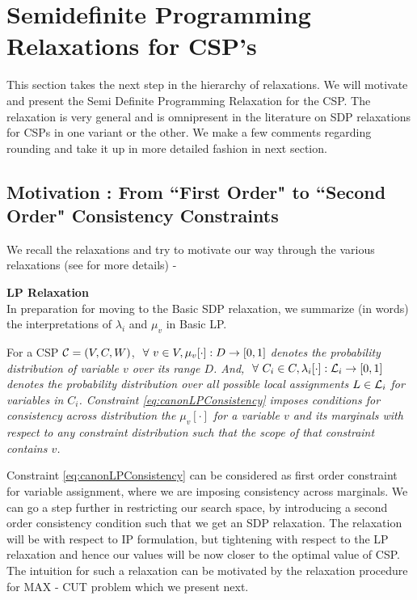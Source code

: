 \section{Semidefinite Programming Relaxations for CSP's}\label{sec:sdpRelax}
This section takes the next step in the hierarchy of relaxations. We will motivate and present the Semi Definite Programming Relaxation for the CSP. The relaxation is very general and is omnipresent in the literature on SDP relaxations for CSPs in one variant or the other. We make a few comments regarding rounding and take it up in more detailed fashion in next section.


\subsection{Motivation : From ``First Order" to ``Second Order" Consistency Constraints}

We recall the relaxations and try to motivate our way through the various relaxations (see \cite{Ryan} for more details) -

\begin{discussion}{\bf LP Relaxation}\\
In preparation for moving to the Basic SDP relaxation, we summarize (in words) the interpretations of $\lambda_i$ and $\mu_v$ in Basic LP.

For a CSP $\mathcal{C} = (V, C, W)$,  \textit{$\ \forall \  v \in V, \mu_v[\cdot] : D \rightarrow [0, 1]$ denotes the \textit{probability distribution of variable $v$ over its range $D$}. And, $\ \forall \  C_i \in C, \lambda_{i}[\cdot] : \mathcal{L}_{i} \rightarrow [0,1]$ denotes the probability distribution over all possible local assignments $L \in \mathcal{L}_{i}$ for variables in  $C_i$.  
Constraint \ref{eq:canonLPConsistency} imposes conditions for consistency across distribution the $\mu_v[\cdot]$ for a variable $v$ and its marginals with respect to any constraint distribution such that the scope of that constraint contains $v$.}
\end{discussion}

Constraint \ref{eq:canonLPConsistency} can be considered as first order constraint for variable assignment, where we are imposing consistency across marginals. 
We can go a step further in restricting our search space, by introducing a second order consistency condition such that we get an SDP relaxation. 
The relaxation will be with respect to IP formulation, but tightening with respect to the LP relaxation and hence our values will be now closer to the optimal value of CSP. 
The intuition for such a relaxation can be motivated by the relaxation procedure for MAX - CUT problem which we present next. 

